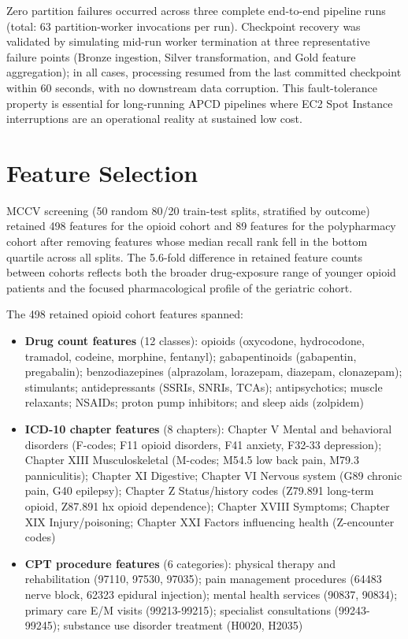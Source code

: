 \documentclass[
  12pt,
]{book}
\providecommand{\tightlist}{%
  \setlength{\itemsep}{0pt}\setlength{\parskip}{0pt}}
\begin{document}
Zero partition failures occurred across three complete end-to-end
pipeline runs (total: 63 partition-worker invocations per run).
Checkpoint recovery was validated by simulating mid-run worker
termination at three representative failure points (Bronze ingestion,
Silver transformation, and Gold feature aggregation); in all cases,
processing resumed from the last committed checkpoint within 60 seconds,
with no downstream data corruption. This fault-tolerance property is
essential for long-running APCD pipelines where EC2 Spot Instance
interruptions are an operational reality at sustained low cost.

\section{Feature Selection}\label{feature-selection}

MCCV screening (50 random 80/20 train-test splits, stratified by
outcome) retained 498 features for the opioid cohort and 89 features for
the polypharmacy cohort after removing features whose median recall rank
fell in the bottom quartile across all splits. The 5.6-fold difference
in retained feature counts between cohorts reflects both the broader
drug-exposure range of younger opioid patients and the focused
pharmacological profile of the geriatric cohort.

The 498 retained opioid cohort features spanned:

\begin{itemize}
\tightlist
\item
  \textbf{Drug count features} (12 classes): opioids (oxycodone,
  hydrocodone, tramadol, codeine, morphine, fentanyl); gabapentinoids
  (gabapentin, pregabalin); benzodiazepines (alprazolam, lorazepam,
  diazepam, clonazepam); stimulants; antidepressants (SSRIs, SNRIs,
  TCAs); antipsychotics; muscle relaxants; NSAIDs; proton pump
  inhibitors; and sleep aids (zolpidem)
\item
  \textbf{ICD-10 chapter features} (8 chapters): Chapter V Mental and
  behavioral disorders (F-codes; F11 opioid disorders, F41 anxiety,
  F32-33 depression); Chapter XIII Musculoskeletal (M-codes; M54.5 low
  back pain, M79.3 panniculitis); Chapter XI Digestive; Chapter VI
  Nervous system (G89 chronic pain, G40 epilepsy); Chapter Z
  Status/history codes (Z79.891 long-term opioid, Z87.891 hx opioid
  dependence); Chapter XVIII Symptoms; Chapter XIX Injury/poisoning;
  Chapter XXI Factors influencing health (Z-encounter codes)
\item
  \textbf{CPT procedure features} (6 categories): physical therapy and
  rehabilitation (97110, 97530, 97035); pain management procedures
  (64483 nerve block, 62323 epidural injection); mental health services
  (90837, 90834); primary care E/M visits (99213-99215); specialist
  consultations (99243-99245); substance use disorder treatment (H0020,
  H2035)
\end{itemize}
\end{document}
